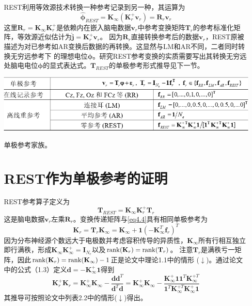 REST利用等效源技术转换一种参考记录到另一种，其运算为
\begin{equation}\label{eq4.6}
\hat{\mathbf{\phi}}_{REST}=\mathbf{K}_{\infty}(\mathbf{K}_r^+\mathbf{v}_r)=\mathbf{R}_r\mathbf{v}_r
\end{equation}
这里$\mathbf{R}_r=\mathbf{K}_{\infty}\mathbf{K}_r^+$是依赖内在嵌入脑电数据$\mathbf{v}_r$中参考变换矩阵$\mathbf{T}_r$的参考标准化矩阵，等效源近似估计为$\hat{\mathbf{j}}=\mathbf{K}_r^+\mathbf{v}_r$。 因为$\mathbf{R}_r$直接转换参考后的数据$\mathbf{v}_r$，REST原被描述为对已参考如AR变换后数据的再转换。这显然与LM和AR不同，二者同时转换无穷远参考下
的理想电位$\mathbf{\phi}$。研究REST参考变换的实质需要写出其转换无穷远处脑电电位$\mathbf{\phi}$的显式表达式。$\mathbf{T}_{REST}$的单极参考形式推导见下一节。
\bigskip
\begin{table}[!h]
  \includegraphics[width=\linewidth]{pic/ref3/table.png}
  \caption{单极参考家族。}
  \label{tab}
\end{table}

\section{REST作为单极参考的证明}\label{4:RESTasUR}
REST参考算子定义为
\begin{equation}\label{eq4.7}
\mathbf{T}_{REST}=\mathbf{K}_{\infty}\mathbf{K}_r^+\mathbf{T}_r
\end{equation}
这是脑电数据$\mathbf{v}_r$左乘$\mathbf{R}_r$。变换传递矩阵与\eqref{eq4.4}具有相同单极参考为
\begin{equation}\label{eq4.8}
\mathbf{K}_{r}=\mathbf{T}_r\mathbf{K}_{\infty}=\mathbf{K}_{\infty}+\mathbf{1}(\mathbf{-K}_{\infty}^T\mathbf{f}_r)^T
\end{equation}
因为分布神经源个数远大于电极数并考虑容积传导的异质性，$\mathbf{K}_{\infty}$所有行相互独立即行满秩，形成$\mathbf{K}_{\infty}\mathbf{K}_{\infty}^+=\mathbf{I}_{N_e}$以及$\operatorname{rank}(\mathbf{K}_r)=\operatorname{rank}(\mathbf{T}_r)$。 注意$\mathbf{T}_r$是满秩亏一矩阵，因此$\operatorname{rank}(\mathbf{K}_r)=\operatorname{rank}(\mathbf{K}_{\infty})-1$正是论文中理论1.1中的情形 ($\downarrow$)。通过论文中的公式（1.3）定义$\mathbf{d}=-\mathbf{K}_{\infty}^+\mathbf{1}$得到
\begin{equation}\label{eq4.9}
\mathbf{K}_{r}^+\mathbf{K}_{r}=\mathbf{K}_{\infty}^+\mathbf{K}_{\infty}-\frac{\mathbf{dd}^T}{{\mathbf{d}^T\mathbf{d}}}=\mathbf{K}_{\infty}^+\mathbf{K}_{\infty}-\frac{\mathbf{K}_{\infty}^+\mathbf{11}^T\mathbf{K}_{\infty}^{+T}}{{\mathbf{1}^T\mathbf{K}_{\infty}^{+T}\mathbf{K}_{\infty}^+\mathbf{1}}}
\end{equation}
其推导可按照论文中列表2.2中的情形($\downarrow$)得出。

